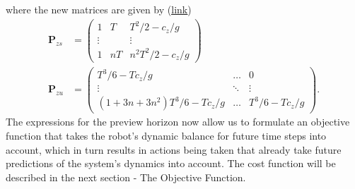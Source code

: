 where the new matrices are given by (\href{https://github.com/mhubii/nmpc_pattern_generator/blob/5a213044c927dc6aac9f7e32ce1e5fb472cd67bb/libs/pattern_generator/src/base_generator.cpp#L420}{\underline{link}})
\begin{align}
	\bm{P}_{zs} &= \begin{pmatrix}
	1 & T & T^2/2 - c_z/g \\
	\vdots & & \vdots \\
	1 & nT & n^2T^2/2 - c_z/g
	\end{pmatrix} \\ 
	\bm{P}_{zu} &= \begin{pmatrix}
	T^3/6 - Tc_z/g & \dots & 0 \\
	\vdots & \ddots & \vdots \\
	(1+3n+3n^2)T^3/6 - Tc_z/g & \dots & T^3/6-Tc_z/g
	\end{pmatrix}.
\end{align}
The expressions for the preview horizon now allow us to formulate an objective function that takes the robot's dynamic balance for future time steps into account, which in turn results in actions being taken that already take future predictions of the system's dynamics into account. The cost function will be described in the next section - The Objective Function.
\FloatBarrier
